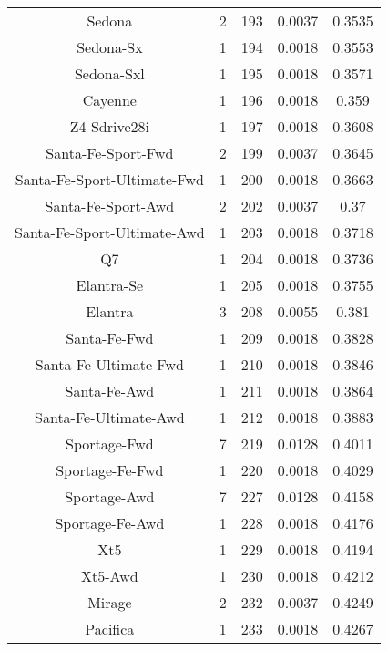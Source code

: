 \begin{center}
\begin{tabular}{|c|c|c|c|@{}c@{}|}
Sedona & 2 & 193 & 0.0037 & 0.3535 \\ 
Sedona-Sx & 1 & 194 & 0.0018 & 0.3553 \\ 
Sedona-Sxl & 1 & 195 & 0.0018 & 0.3571 \\ 
Cayenne & 1 & 196 & 0.0018 & 0.359 \\ 
Z4-Sdrive28i & 1 & 197 & 0.0018 & 0.3608 \\ 
Santa-Fe-Sport-Fwd & 2 & 199 & 0.0037 & 0.3645 \\ 
Santa-Fe-Sport-Ultimate-Fwd & 1 & 200 & 0.0018 & 0.3663 \\ 
Santa-Fe-Sport-Awd & 2 & 202 & 0.0037 & 0.37 \\ 
Santa-Fe-Sport-Ultimate-Awd & 1 & 203 & 0.0018 & 0.3718 \\ 
Q7 & 1 & 204 & 0.0018 & 0.3736 \\ 
Elantra-Se & 1 & 205 & 0.0018 & 0.3755 \\ 
Elantra & 3 & 208 & 0.0055 & 0.381 \\ 
Santa-Fe-Fwd & 1 & 209 & 0.0018 & 0.3828 \\ 
Santa-Fe-Ultimate-Fwd & 1 & 210 & 0.0018 & 0.3846 \\ 
Santa-Fe-Awd & 1 & 211 & 0.0018 & 0.3864 \\ 
Santa-Fe-Ultimate-Awd & 1 & 212 & 0.0018 & 0.3883 \\ 
Sportage-Fwd & 7 & 219 & 0.0128 & 0.4011 \\ 
Sportage-Fe-Fwd & 1 & 220 & 0.0018 & 0.4029 \\ 
Sportage-Awd & 7 & 227 & 0.0128 & 0.4158 \\ 
Sportage-Fe-Awd & 1 & 228 & 0.0018 & 0.4176 \\ 
Xt5 & 1 & 229 & 0.0018 & 0.4194 \\ 
Xt5-Awd & 1 & 230 & 0.0018 & 0.4212 \\ 
Mirage & 2 & 232 & 0.0037 & 0.4249 \\ 
Pacifica & 1 & 233 & 0.0018 & 0.4267 \\ 
\hline
\end{tabular}
\end{center} \vfill

